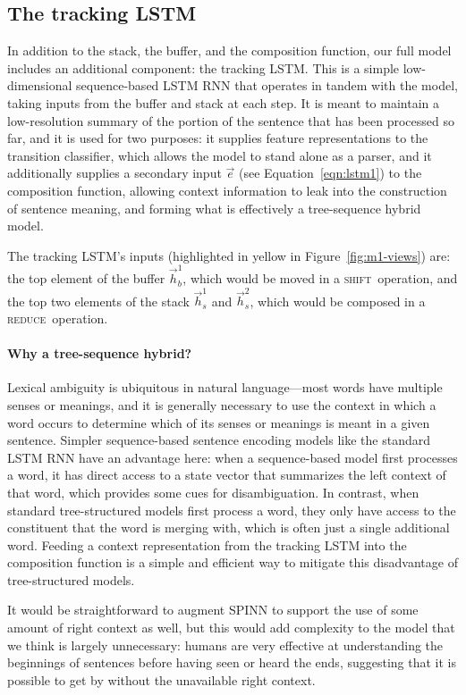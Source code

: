 \documentclass[11pt]{article}
\newcommand{\shift}{\textsc{shift}}
\newcommand{\reduce}{\textsc{reduce}}
\begin{document}
\subsection{The tracking LSTM}\label{sec:tracking}

In addition to the stack, the buffer, and the composition function, our full model includes an additional component: the tracking LSTM. This is a simple low-dimensional sequence-based LSTM RNN that operates in tandem with the model, taking inputs from the buffer and stack at each step. It is meant to maintain a low-resolution summary of the portion of the sentence that has been processed so far, and it is used for two purposes: it supplies feature representations to the transition classifier, which allows the model to stand alone as a parser, and it additionally supplies a secondary input $\vec{e}$ (see Equation~\ref{eqn:lstm1}) to the composition function, allowing context information to leak into the construction of sentence meaning, and forming what is effectively a tree-sequence hybrid model.

The tracking LSTM's inputs (highlighted in yellow in Figure~\ref{fig:m1-views}) are: the top element of the buffer $\vec{h}_b^1$, which would be moved in a \shift~operation, and the top two elements of the stack $\vec{h}_s^1$ and $\vec{h}_s^2$, which would be composed in a \reduce~operation.

\paragraph{Why a tree-sequence hybrid?} Lexical ambiguity is ubiquitous in natural language---most words have multiple senses or meanings, and it is generally necessary to use the context in which a word occurs to determine which of its senses or meanings is meant in a given sentence. Simpler sequence-based sentence encoding models like the standard LSTM RNN have an advantage here: when a sequence-based model first processes a word, it has direct access to a state vector that summarizes the left context of that word, which provides some cues for disambiguation. In contrast, when standard tree-structured models first process a word, they only have access to the constituent that the word is merging with, which is often just a single additional word. Feeding a context representation from the tracking LSTM into the composition function is a simple and efficient way to mitigate this disadvantage of tree-structured models. 

It would be straightforward to augment SPINN to support the use of some amount of right context as well, but this would add complexity to the model that we think is largely unnecessary: humans are very effective at understanding the beginnings of sentences before having seen or heard the ends, suggesting that it is possible to get by without the unavailable right context.
\end{document}
